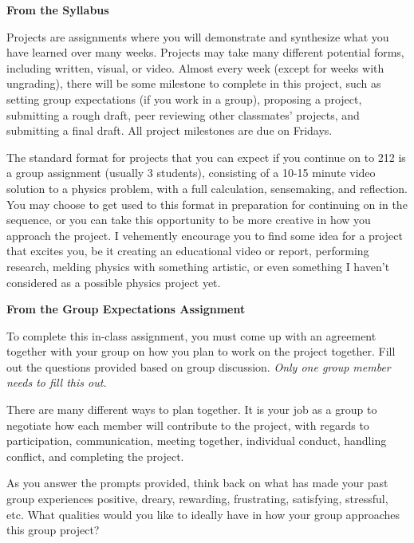 \documentclass[]{article}
\begin{document}
\begin{TeacherMargin}
	\noindent\textbf{From the Syllabus}
	
	Projects are assignments where you will demonstrate and synthesize what you have learned over many weeks. Projects may take many different potential forms, including written, visual, or video. Almost every week (except for weeks with ungrading), there will be some milestone to complete in this project, such as setting group expectations (if you work in a group), proposing a project, submitting a rough draft, peer reviewing other classmates’ projects, and submitting a final draft. All project milestones are due on Fridays.
	
	The standard format for projects that you can expect if you continue on to 212 is a group assignment (usually 3 students), consisting of a 10-15 minute video solution to a physics problem, with a full calculation, sensemaking, and reflection. You may choose to get used to this format in preparation for continuing on in the sequence, or you can take this opportunity to be more creative in how you approach the project. I vehemently encourage you to find some idea for a project that excites you, be it creating an educational video or report, performing research, melding physics with something artistic, or even something I haven’t considered as a possible physics project yet.
	
	\noindent\textbf{From the Group Expectations Assignment}
	
	To complete this in-class assignment, you must come up with an agreement together with your group on how you plan to work on the project together. Fill out the questions provided based on group discussion. \textit{Only one group member needs to fill this out.}
	
	There are many different ways to plan together. It is your job as a group to negotiate how each member will contribute to the project, with regards to participation, communication, meeting together, individual conduct, handling conflict, and completing the project.
	
	As you answer the prompts provided, think back on what has made your past group experiences positive, dreary, rewarding, frustrating, satisfying, stressful, etc. What qualities would you like to ideally have in how your group approaches this group project?
\end{TeacherMargin}
\end{document}
